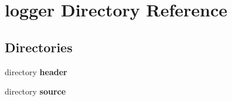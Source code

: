 \section{logger Directory Reference}
\label{dir_e546037d539dab48998ac54ab76cb525}
\subsection*{Directories}
\begin{DoxyCompactItemize}
\item 
directory {\bf header}
\item 
directory {\bf source}
\end{DoxyCompactItemize}
